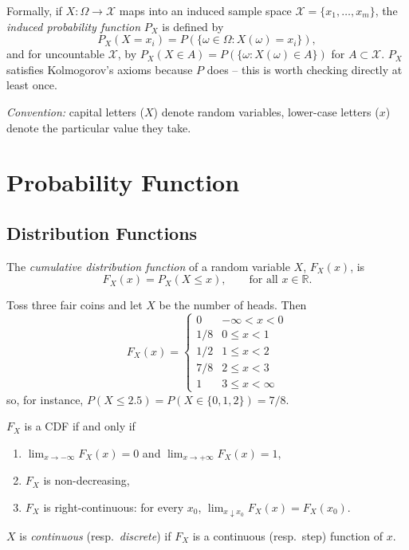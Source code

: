 \documentclass[11pt]{article}
\begin{document}
Formally, if $X : \Omega \to \mathcal{X}$ maps into an induced sample space
$\mathcal{X} = \{x_1, \dots, x_m\}$, the \emph{induced probability function}
$P_X$ is defined by
\[
  P_X(X = x_i) = P(\{\omega \in \Omega : X(\omega) = x_i\}),
\]
and for uncountable $\mathcal{X}$, by $P_X(X \in A) = P(\{\omega : X(\omega)
\in A\})$ for $A \subset \mathcal{X}$. $P_X$ satisfies Kolmogorov's axioms
because $P$ does -- this is worth checking directly at least once.

\emph{Convention:} capital letters ($X$) denote random variables, lower-case
letters ($x$) denote the particular value they take.

\section{Probability Function}

\subsection{Distribution Functions}

\begin{definition}[CDF]
The \emph{cumulative distribution function} of a random variable $X$,
$F_X(x)$, is
\[
  F_X(x) = P_X(X \le x), \qquad \text{for all } x \in \mathbb{R}.
\]
\end{definition}

\begin{example}
Toss three fair coins and let $X$ be the number of heads. Then
\[
F_X(x) =
\begin{cases}
0 & -\infty < x < 0 \\
1/8 & 0 \le x < 1 \\
1/2 & 1 \le x < 2 \\
7/8 & 2 \le x < 3 \\
1 & 3 \le x < \infty
\end{cases}
\]
so, for instance, $P(X \le 2.5) = P(X \in \{0,1,2\}) = 7/8$.
\end{example}

\begin{theorem}
$F_X$ is a CDF if and only if
\begin{enumerate}
  \item $\lim_{x \to -\infty} F_X(x) = 0$ and $\lim_{x \to +\infty} F_X(x) =
        1$,
  \item $F_X$ is non-decreasing,
  \item $F_X$ is right-continuous: for every $x_0$,
        $\lim_{x \downarrow x_0} F_X(x) = F_X(x_0)$.
\end{enumerate}
$X$ is \emph{continuous} (resp.\ \emph{discrete}) if $F_X$ is a continuous
(resp.\ step) function of $x$.
\end{theorem}
\end{document}
